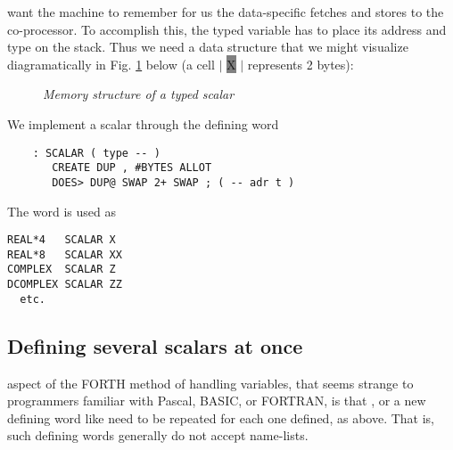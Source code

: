  want the machine to remember for us the data-specific fetches and
stores to the co-processor. To accomplish this, the typed variable has to place
its address and type on the stack. Thus we need a data structure that we might
visualize diagramatically in Fig. \ref{fig:05_01} below (a cell $\mathbf{\big |}$
{\colorbox{gray}{\color{gray}X}} 
$\mathbf{\big |}$ represents 2 bytes): 
\begin{figure}
    \center
    \caption{\textit{Memory structure of a typed scalar}}
    \label{fig:05_01}
\end{figure}
 

We implement a scalar through the defining word

\begin{lstlisting}
    : SCALAR ( type -- )
       CREATE DUP , #BYTES ALLOT
       DOES> DUP@ SWAP 2+ SWAP ; ( -- adr t )
\end{lstlisting}

The word  is used as
\begin{lstlisting}
REAL*4   SCALAR X
REAL*8   SCALAR XX
COMPLEX  SCALAR Z
DCOMPLEX SCALAR ZZ
  etc.
\end{lstlisting}

\subsection{Defining several scalars at once}
 aspect of the FORTH method of handling variables, that seems strange to programmers familiar with Pascal, BASIC, or FORTRAN, is that ,  or a new defining word like  need to be repeated for each one defined, as above. That is, such defining words generally do not accept name-lists.

